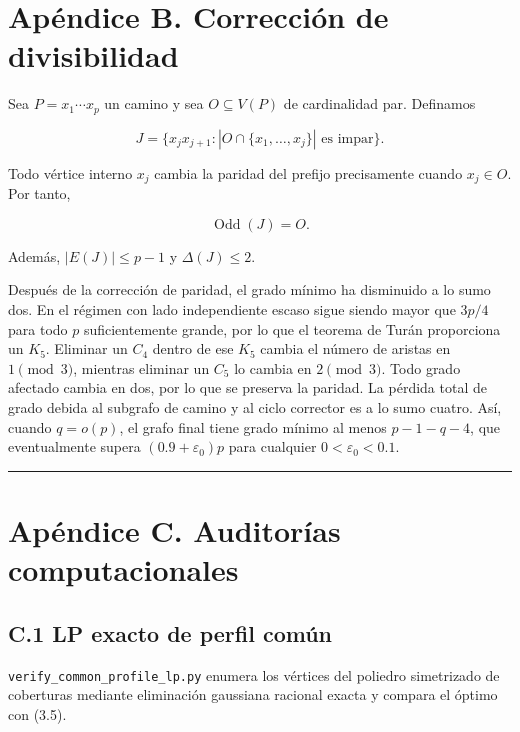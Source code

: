 \documentclass[
  spanish,
  11pt,
  a4paper,
]{article}
\begin{document}
\section{Apéndice B. Corrección de divisibilidad}\label{apuxe9ndice-b.-correcciuxf3n-de-divisibilidad}

Sea \(P=x_1\cdots x_p\) un camino y sea \(O\subseteq V(P)\) de cardinalidad par. Definamos

\[
J=\{x_jx_{j+1}:|O\cap\{x_1,\ldots,x_j\}|\text{ es impar}\}.
\]

Todo vértice interno \(x_j\) cambia la paridad del prefijo precisamente cuando \(x_j\in O\). Por tanto,

\[
\operatorname{Odd}(J)=O.
\]

Además, \(|E(J)|\le p-1\) y \(\Delta(J)\le2\).

Después de la corrección de paridad, el grado mínimo ha disminuido a lo sumo dos. En el régimen con lado independiente escaso sigue siendo mayor que \(3p/4\) para todo \(p\) suficientemente grande, por lo que el teorema de Turán proporciona un \(K_5\). Eliminar un \(C_4\) dentro de ese \(K_5\) cambia el número de aristas en \(1\pmod3\), mientras eliminar un \(C_5\) lo cambia en \(2\pmod3\). Todo grado afectado cambia en dos, por lo que se preserva la paridad. La pérdida total de grado debida al subgrafo de camino y al ciclo corrector es a lo sumo cuatro. Así, cuando \(q=o(p)\), el grafo final tiene grado mínimo al menos \(p-1-q-4\), que eventualmente supera \((0.9+\varepsilon_0)p\) para cualquier \(0<\varepsilon_0<0.1\).

\begin{center}\rule{0.5\linewidth}{0.5pt}\end{center}

\section{Apéndice C. Auditorías computacionales}\label{apuxe9ndice-c.-auditoruxedas-computacionales}

\subsection{C.1 LP exacto de perfil común}\label{c.1-lp-exacto-de-perfil-comuxfan}

\texttt{verify\_common\_profile\_lp.py} enumera los vértices del poliedro simetrizado de coberturas mediante eliminación gaussiana racional exacta y compara el óptimo con (3.5).
\end{document}
